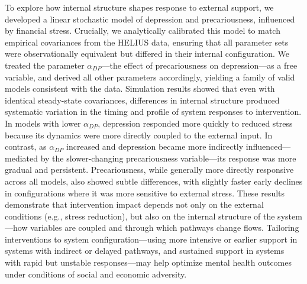 \documentclass[
]{article}
\begin{document}
To explore how internal structure shapes response to external support,
we developed a linear stochastic model of depression and precariousness,
influenced by financial stress. Crucially, we analytically calibrated
this model to match empirical covariances from the HELIUS data, ensuring
that all parameter sets were observationally equivalent but differed in
their internal configuration. We treated the parameter
\(\alpha_{DP}\)---the effect of precariousness on depression---as a free
variable, and derived all other parameters accordingly, yielding a
family of valid models consistent with the data. Simulation results
showed that even with identical steady-state covariances, differences in
internal structure produced systematic variation in the timing and
profile of system responses to intervention. In models with lower
\(\alpha_{DP}\), depression responded more quickly to reduced stress
because its dynamics were more directly coupled to the external input.
In contrast, as \(\alpha_{DP}\) increased and depression became more
indirectly influenced---mediated by the slower-changing precariousness
variable---its response was more gradual and persistent. Precariousness,
while generally more directly responsive across all models, also showed
subtle differences, with slightly faster early declines in
configurations where it was more sensitive to external stress. These
results demonstrate that intervention impact depends not only on the
external conditions (e.g., stress reduction), but also on the internal
structure of the system---how variables are coupled and through which
pathways change flows. Tailoring interventions to system
configuration---using more intensive or earlier support in systems with
indirect or delayed pathways, and sustained support in systems with
rapid but unstable responses---may help optimize mental health outcomes
under conditions of social and economic adversity.
\end{document}
